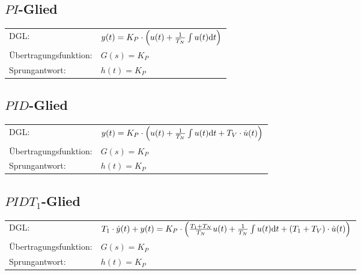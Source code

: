 \subsection{$PI$-Glied}
\begin{tabular}{ll}
\rule[-2ex]{0pt}{5.5ex} DGL: & $y(t) = K_P \cdot \left( u(t) + \frac{1}{T_N}\int u(t) \mathrm{d} t\right)$ \\ 
\rule[-2ex]{0pt}{5.5ex} Übertragungsfunktion: & $G(s) = K_P$ \\ 
\rule[-2ex]{0pt}{5.5ex} Sprungantwort: & $h(t) = K_P$ \\ 
\end{tabular} 
\subsection{$PID$-Glied}
\begin{tabular}{ll}
\rule[-2ex]{0pt}{5.5ex} DGL: &  $y(t) = K_P \cdot \left( u(t) + \frac{1}{T_N}\int u(t) \mathrm{d} t + T_V \cdot \dot{u}(t) \right)$ \\ 
\rule[-2ex]{0pt}{5.5ex} Übertragungsfunktion: & $G(s) = K_P$ \\ 
\rule[-2ex]{0pt}{5.5ex} Sprungantwort: & $h(t) = K_P$ \\ 
\end{tabular} 
\subsection{$PIDT_1$-Glied}
\begin{tabular}{ll}
\rule[-2ex]{0pt}{5.5ex} DGL: & \scriptsize$T_1 \cdot \dot{y}(t) +y(t) = K_P \cdot \left( \frac{T_1 + T_N}{T_N} u(t) + \frac{1}{T_N}\int u(t) \mathrm{d} t + (T_1 + T_V) \cdot \dot{u}(t) \right)$ \\ 
\rule[-2ex]{0pt}{5.5ex} Übertragungsfunktion: & $G(s) = K_P$ \\ 
\rule[-2ex]{0pt}{5.5ex} Sprungantwort: & $h(t) = K_P$ \\ 
\end{tabular}
